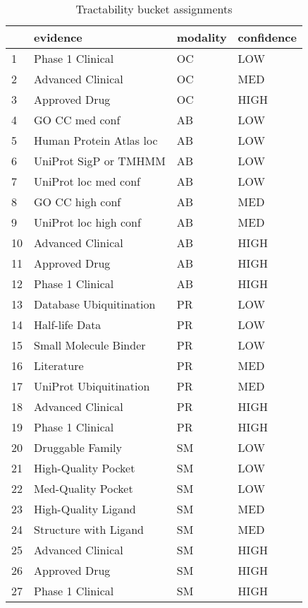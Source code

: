 \begin{table}[H]
\centering
\caption{Tractability bucket assignments}
\label{tab:tractability_buckets}
\begin{tabular}{llll}
\toprule
 & evidence & modality & confidence \\
\midrule
1 & Phase 1 Clinical & OC & LOW \\
2 & Advanced Clinical & OC & MED \\
3 & Approved Drug & OC & HIGH \\
4 & GO CC med conf & AB & LOW \\
5 & Human Protein Atlas loc & AB & LOW \\
6 & UniProt SigP or TMHMM & AB & LOW \\
7 & UniProt loc med conf & AB & LOW \\
8 & GO CC high conf & AB & MED \\
9 & UniProt loc high conf & AB & MED \\
10 & Advanced Clinical & AB & HIGH \\
11 & Approved Drug & AB & HIGH \\
12 & Phase 1 Clinical & AB & HIGH \\
13 & Database Ubiquitination & PR & LOW \\
14 & Half-life Data & PR & LOW \\
15 & Small Molecule Binder & PR & LOW \\
16 & Literature & PR & MED \\
17 & UniProt Ubiquitination & PR & MED \\
18 & Advanced Clinical & PR & HIGH \\
19 & Phase 1 Clinical & PR & HIGH \\
20 & Druggable Family & SM & LOW \\
21 & High-Quality Pocket & SM & LOW \\
22 & Med-Quality Pocket & SM & LOW \\
23 & High-Quality Ligand & SM & MED \\
24 & Structure with Ligand & SM & MED \\
25 & Advanced Clinical & SM & HIGH \\
26 & Approved Drug & SM & HIGH \\
27 & Phase 1 Clinical & SM & HIGH \\
\bottomrule
\end{tabular}
\end{table}
